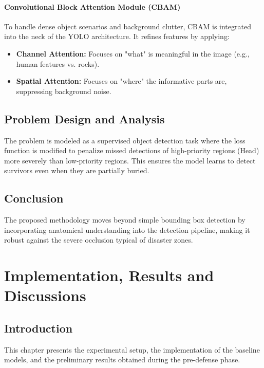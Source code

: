 \documentclass[12pt, a4paper]{report}
\begin{document}
\subsubsection{Convolutional Block Attention Module (CBAM)}
To handle dense object scenarios and background clutter, CBAM is integrated into the neck of the YOLO architecture. It refines features by applying:
\begin{itemize}
    \item \textbf{Channel Attention:} Focuses on "what" is meaningful in the image (e.g., human features vs. rocks).
    \item \textbf{Spatial Attention:} Focuses on "where" the informative parts are, suppressing background noise.
\end{itemize}

\section{Problem Design and Analysis}
The problem is modeled as a supervised object detection task where the loss function is modified to penalize missed detections of high-priority regions (Head) more severely than low-priority regions. This ensures the model learns to detect survivors even when they are partially buried.

\section{Conclusion}
The proposed methodology moves beyond simple bounding box detection by incorporating anatomical understanding into the detection pipeline, making it robust against the severe occlusion typical of disaster zones.

\chapter{Implementation, Results and Discussions}

\section{Introduction}
This chapter presents the experimental setup, the implementation of the baseline models, and the preliminary results obtained during the pre-defense phase.
\end{document}
